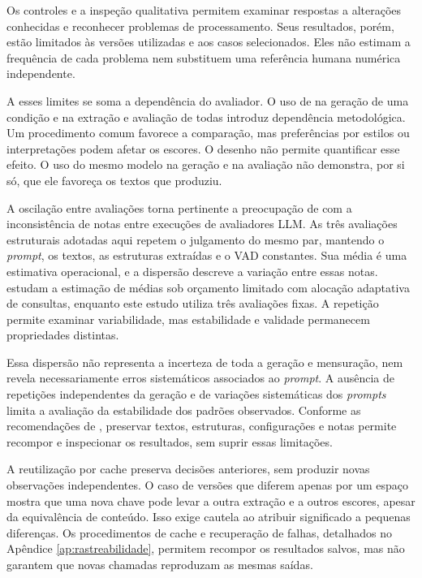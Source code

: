 Os controles e a inspeção qualitativa permitem examinar respostas a alterações conhecidas e reconhecer problemas de processamento. Seus resultados, porém, estão limitados às versões utilizadas e aos casos selecionados. Eles não estimam a frequência de cada problema nem substituem uma referência humana numérica independente.

A esses limites se soma a dependência do avaliador. O uso de  na geração de uma condição e na extração e avaliação de todas introduz dependência metodológica. Um procedimento comum favorece a comparação, mas preferências por estilos ou interpretações podem afetar os escores. O desenho não permite quantificar esse efeito. O uso do mesmo modelo na geração e na avaliação não demonstra, por si só, que ele favoreça os textos que produziu.

A oscilação entre avaliações torna pertinente a preocupação de  com a inconsistência de notas entre execuções de avaliadores LLM. As três avaliações estruturais adotadas aqui repetem o julgamento do mesmo par, mantendo o \textit{prompt}, os textos, as estruturas extraídas e o VAD constantes. Sua média é uma estimativa operacional, e a dispersão descreve a variação entre essas notas.  estudam a estimação de médias sob orçamento limitado com alocação adaptativa de consultas, enquanto este estudo utiliza três avaliações fixas. A repetição permite examinar variabilidade, mas estabilidade e validade permanecem propriedades distintas.

Essa dispersão não representa a incerteza de toda a geração e mensuração, nem revela necessariamente erros sistemáticos associados ao \textit{prompt}. A ausência de repetições independentes da geração e de variações sistemáticas dos \textit{prompts} limita a avaliação da estabilidade dos padrões observados. Conforme as recomendações de , preservar textos, estruturas, configurações e notas permite recompor e inspecionar os resultados, sem suprir essas limitações.

A reutilização por cache preserva decisões anteriores, sem produzir novas observações independentes. O caso de versões que diferem apenas por um espaço mostra que uma nova chave pode levar a outra extração e a outros escores, apesar da equivalência de conteúdo. Isso exige cautela ao atribuir significado a pequenas diferenças. Os procedimentos de cache e recuperação de falhas, detalhados no Apêndice \ref{ap:rastreabilidade}, permitem recompor os resultados salvos, mas não garantem que novas chamadas reproduzam as mesmas saídas.

